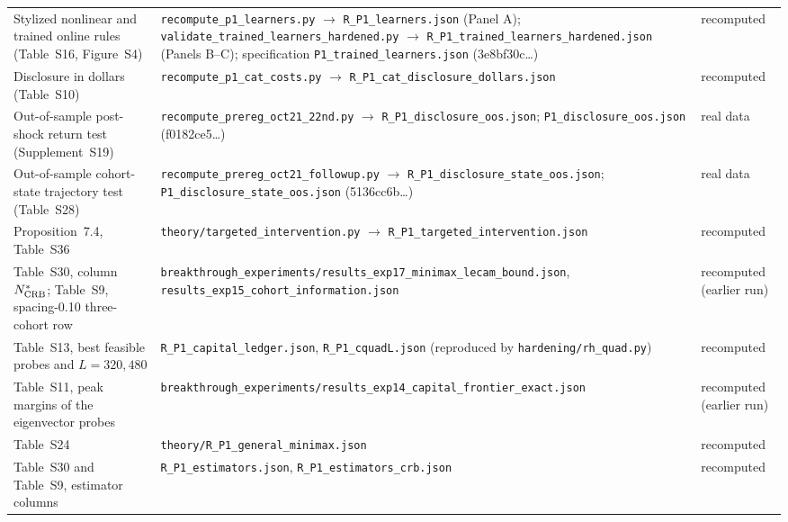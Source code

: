 \documentclass[12pt]{article}
\theoremstyle{definition}
\theoremstyle{remark}
\begin{document}
\begin{longtable}{p{}p{}p{}}
Stylized nonlinear and trained online rules (Table~S16, Figure~S4) & \texttt{recompute\_\allowbreak p1\_\allowbreak learners.py} $\to$ \texttt{R\_P1\_\allowbreak learners.json} (Panel A); \texttt{validate\_\allowbreak trained\_\allowbreak learners\_\allowbreak hardened.py} $\to$ \texttt{R\_P1\_\allowbreak trained\_\allowbreak learners\_\allowbreak hardened.json} (Panels B--C); specification \texttt{P1\_\allowbreak trained\_\allowbreak learners.json} (3e8bf30c\ldots) & recomputed\\
Disclosure in dollars (Table~S10) & \texttt{recompute\_\allowbreak p1\_\allowbreak cat\_\allowbreak costs.py} $\to$ \texttt{R\_P1\_\allowbreak cat\_\allowbreak disclosure\_\allowbreak dollars.json} & recomputed\\
Out-of-sample post-shock return test (Supplement~S19) & \texttt{recompute\_\allowbreak prereg\_\allowbreak oct21\_\allowbreak 22nd.py} $\to$ \texttt{R\_P1\_\allowbreak disclosure\_\allowbreak oos.json}; \texttt{P1\_\allowbreak disclosure\_\allowbreak oos.json} (f0182ce5\ldots) & real data\\
Out-of-sample cohort-state trajectory test (Table~S28) & \texttt{recompute\_\allowbreak prereg\_\allowbreak oct21\_\allowbreak followup.py} $\to$ \texttt{R\_P1\_\allowbreak disclosure\_\allowbreak state\_\allowbreak oos.json}; \texttt{P1\_\allowbreak disclosure\_\allowbreak state\_\allowbreak oos.json} (5136cc6b\ldots) & real data\\
\bottomrule
Proposition~7.4, Table~S36 & \texttt{theory/targeted\_intervention.py} $\to$ \texttt{R\_P1\_targeted\_intervention.json} & recomputed\\
Table~S30, column $N^*_{\rm CRB}$; Table~S9, spacing-0.10 three-cohort row & \texttt{breakthrough\_experiments/results\_exp17\_minimax\_lecam\_bound.json}, \texttt{results\_exp15\_cohort\_information.json} & recomputed (earlier run)\\
Table~S13, best feasible probes and $L=320,480$ & \texttt{R\_P1\_capital\_ledger.json}, \texttt{R\_P1\_cquadL.json} (reproduced by \texttt{hardening/rh\_quad.py}) & recomputed\\
Table~S11, peak margins of the eigenvector probes & \texttt{breakthrough\_experiments/results\_exp14\_capital\_frontier\_exact.json} & recomputed (earlier run)\\
Table~S24 & \texttt{theory/R\_P1\_general\_minimax.json} & recomputed\\
Table~S30 and Table~S9, estimator columns & \texttt{R\_P1\_estimators.json}, \texttt{R\_P1\_estimators\_crb.json} & recomputed\\

\end{longtable}
\end{document}
